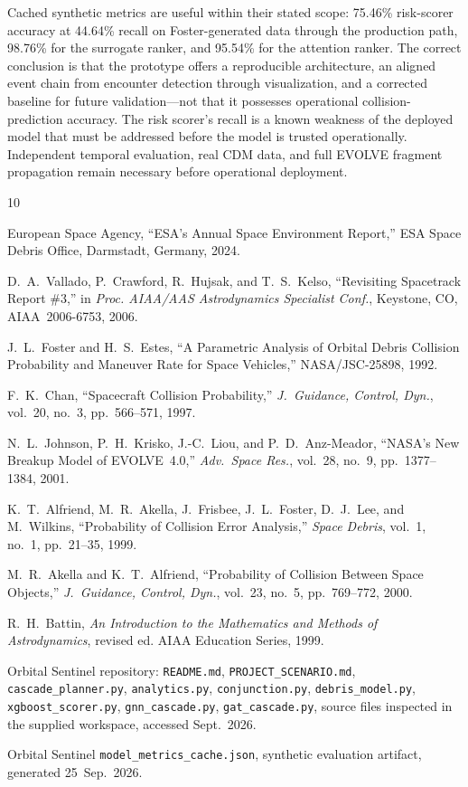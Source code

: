 \documentclass[conference]{IEEEtran}
\begin{document}
Cached synthetic metrics are useful within their stated scope: 75.46\%
risk-scorer accuracy at 44.64\% recall on Foster-generated data through the
production path, 98.76\% for the surrogate ranker, and 95.54\% for the attention
ranker. The correct conclusion is that the prototype offers a reproducible
architecture, an aligned event chain from encounter detection through
visualization, and a corrected baseline for future validation---not that it
possesses operational collision-prediction accuracy. The risk scorer's recall is
a known weakness of the deployed model that must be addressed before the model
is trusted operationally. Independent temporal evaluation, real CDM data, and full
EVOLVE fragment propagation remain necessary before operational deployment.

\begin{thebibliography}{10}

European Space Agency, ``ESA's Annual Space Environment Report,''
ESA Space Debris Office, Darmstadt, Germany, 2024.

D.~A.~Vallado, P.~Crawford, R.~Hujsak, and T.~S.~Kelso,
``Revisiting Spacetrack Report \#3,''
in \emph{Proc. AIAA/AAS Astrodynamics Specialist Conf.},
Keystone, CO, AIAA~2006-6753, 2006.

J.~L.~Foster and H.~S.~Estes,
``A Parametric Analysis of Orbital Debris Collision Probability
  and Maneuver Rate for Space Vehicles,''
NASA/JSC-25898, 1992.

F.~K.~Chan,
``Spacecraft Collision Probability,''
\emph{J.~Guidance, Control, Dyn.},
vol.~20, no.~3, pp.~566--571, 1997.

N.~L.~Johnson, P.~H.~Krisko, J.-C.~Liou, and P.~D.~Anz-Meador,
``NASA's New Breakup Model of EVOLVE~4.0,''
\emph{Adv.~Space Res.}, vol.~28, no.~9, pp.~1377--1384, 2001.

K.~T.~Alfriend, M.~R.~Akella, J.~Frisbee, J.~L.~Foster,
D.~J.~Lee, and M.~Wilkins,
``Probability of Collision Error Analysis,''
\emph{Space Debris}, vol.~1, no.~1, pp.~21--35, 1999.

M.~R.~Akella and K.~T.~Alfriend,
``Probability of Collision Between Space Objects,''
\emph{J.~Guidance, Control, Dyn.}, vol.~23, no.~5, pp.~769--772, 2000.

R.~H.~Battin,
\emph{An Introduction to the Mathematics and Methods of Astrodynamics},
revised ed.
AIAA Education Series, 1999.

Orbital Sentinel repository: \texttt{README.md},
\texttt{PROJECT\_SCENARIO.md}, \texttt{cascade\_planner.py},
\texttt{analytics.py}, \texttt{conjunction.py}, \texttt{debris\_model.py},
\texttt{xgboost\_scorer.py}, \texttt{gnn\_cascade.py}, \texttt{gat\_cascade.py},
source files inspected in the supplied workspace, accessed Sept.\ 2026.

Orbital Sentinel \texttt{model\_metrics\_cache.json},
synthetic evaluation artifact, generated 25~Sep.\ 2026.

\end{thebibliography}
\end{document}
